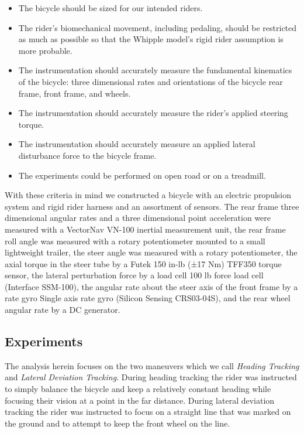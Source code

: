 \documentclass[a4paper]{article}
\begin{document}
\begin{itemize}
  \item The bicycle should be sized for our intended riders.
  \item The rider's biomechanical movement, including pedaling, should be
    restricted as much as possible so that the Whipple model's rigid rider
    assumption is more probable.
  \item The instrumentation should accurately measure the fundamental
    kinematics of the bicycle: three dimensional rates and orientations of the
    bicycle rear frame, front frame, and wheels.
  \item The instrumentation should accurately measure the rider's applied
    steering torque.
  \item The instrumentation should accurately measure an applied lateral
    disturbance force to the bicycle frame.
  \item The experiments could be performed on open road or on a treadmill.
\end{itemize}

With these criteria in mind we constructed a bicycle with an electric
propulsion system and rigid rider harness and an assortment of sensors. The
rear frame three dimensional angular rates and a three dimensional point
acceleration were measured with a VectorNav VN-100 inertial measurement unit,
the rear frame roll angle was measured with a rotary potentiometer mounted to a
small lightweight trailer, the steer angle was measured with a rotary
potentiometer, the axial torque in the steer tube by a Futek 150 in-lb (±17 Nm)
TFF350 torque sensor, the lateral perturbation force by a load cell 100 lb
force load cell (Interface SSM-100), the angular rate about the steer axis of
the front frame by a rate gyro Single axis rate gyro (Silicon Sensing
CRS03-04S), and the rear wheel angular rate by a DC generator.


\subsection{Experiments}

The analysis herein focuses on the two maneuvers which we call \emph{Heading
Tracking} and \emph{Lateral Deviation Tracking}. During heading tracking the
rider was instructed to simply balance the bicycle and keep a relatively
constant heading while focusing their vision at a point in the far distance.
During lateral deviation tracking the rider was instructed to focus on a
straight line that was marked on the ground and to attempt to keep the front
wheel on the line.
\end{document}
